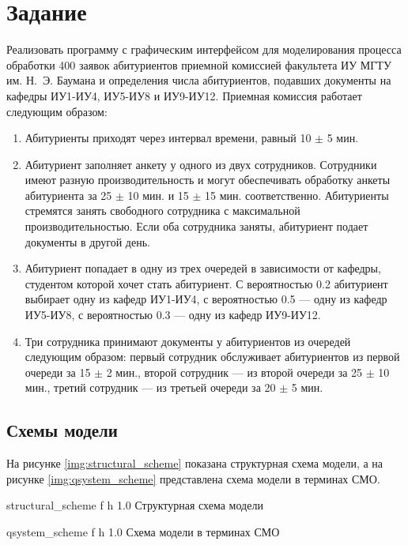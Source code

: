 \chapter{Задание}

Реализовать программу с графическим интерфейсом для моделирования процесса обработки 400 заявок абитуриентов приемной комиссией факультета ИУ МГТУ им. Н.~Э. Баумана и определения числа абитуриентов, подавших документы на кафедры ИУ1-ИУ4, ИУ5-ИУ8 и ИУ9-ИУ12. Приемная комиссия работает следующим образом:

\begin{enumerate}
	\item Абитуриенты приходят через интервал времени, равный 10 $\pm$ 5 мин.
	\item Абитуриент заполняет анкету у одного из двух сотрудников. Сотрудники имеют разную производительность и могут обеспечивать обработку анкеты абитуриента за 25 $\pm$ 10 мин. и 15 $\pm$ 15 мин. соответственно. Абитуриенты стремятся занять свободного сотрудника с максимальной производительностью. Если оба сотрудника заняты, абитуриент подает документы в другой день.
	\item Абитуриент попадает в одну из трех очередей в зависимости от кафедры, студентом которой хочет стать абитуриент. С вероятностью 0.2 абитуриент выбирает одну из кафедр ИУ1-ИУ4, с вероятностью 0.5 --- одну из кафедр ИУ5-ИУ8, с вероятностью 0.3 --- одну из кафедр ИУ9-ИУ12.
	\item Три сотрудника принимают документы у абитуриентов из очередей следующим образом: первый сотрудник обслуживает абитуриентов из первой очереди за 15 $\pm$ 2 мин., второй сотрудник --- из второй очереди за 25 $\pm$ 10 мин., третий сотрудник --- из третьей очереди за 20 $\pm$ 5 мин.
\end{enumerate}

\section{Схемы модели}

На рисунке \ref{img:structural_scheme} показана структурная схема модели, а на рисунке \ref{img:qsystem_scheme} представлена схема модели в терминах СМО.

    {structural_scheme}
    {f}
    {h}
    {1.0\textwidth}
    {Структурная схема модели}

    {qsystem_scheme}
    {f}
    {h}
    {1.0\textwidth}
    {Схема модели в терминах СМО}

